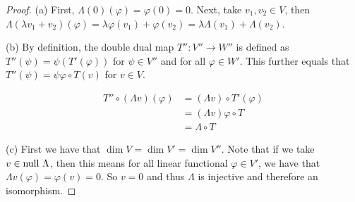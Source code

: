 \documentclass{extarticle}
\begin{document}
\begin{proof}
(a) First, \(\Lambda(0)(\varphi) = \varphi(0) = 0\). Next, take \(v_1, v_2 \in V\), then 
\(\Lambda(\lambda v_1 + v_2) (\varphi) = \lambda\varphi(v_1) + \varphi(v_2) = 
\lambda\Lambda(v_1) + \Lambda(v_2)\).

(b) By definition, the double dual map \(T'' \colon V'' \to W''\) is defined as 
\(T''(\psi) = \psi(T'(\varphi))\) for \(\psi \in V''\) and for all \(\varphi \in W'\). This 
further equals that \(T''(\psi) = \psi \varphi \circ T(v)\) for \(v \in V\). 

\begin{align*}
    T'' \circ (\Lambda v)(\varphi)
    &= (\Lambda v) \circ T' (\varphi) \\ 
    &= (\Lambda v) \varphi \circ T  \\ 
    &= \Lambda \circ T 
\end{align*}


(c) First we have that \(\dim V = \dim V' = \dim V''\). Note that if we take \(v \in \text{null } \Lambda\), 
then this means for all linear functional \(\varphi \in V'\), we have that \(\Lambda v (\varphi)
= \varphi(v) = 0\). So \(v = 0\) and thus \(\Lambda\) is injective and therefore an isomorphism.
\end{proof}
\end{document}

